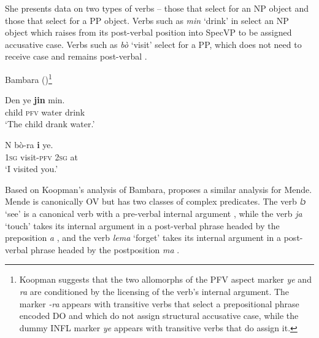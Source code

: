 \documentclass[output=paper,colorlinks,citecolor=brown,draftmode
]{langscibook}
\begin{document}
She presents data on two types of verbs – those that select for an NP object and those that select for a PP object. Verbs such as \textit{min} ‘drink’ in  select an NP object which raises from its post-verbal position into SpecVP to be assigned accusative case. Verbs such as \textit{bò} ‘visit’ select for a PP, which does not need to receive case and remains post-verbal . 


\ea \label{ex:Bambara}
Bambara (\citealt[6a and 7a]{koopman1992absence})\footnote{Koopman suggests that the two allomorphs of the PFV aspect marker \textit{ye} and \textit{ra} are conditioned by the licensing of the verb’s internal argument.  The marker \textit{-ra} appears with transitive verbs that select a prepositional phrase encoded DO and which do not assign structural accusative case, while the dummy INFL marker \textit{ye} appears with transitive verbs that do assign it.}
\begin{xlist}

\ex \label{ex:Bambara:Canonical}
\gll Den ye \textbf{jin} min. \\
child \textsc{pfv} water drink \\
\glt `The child drank water.'

\ex \label{ex:Bambara:PV}
\gll N bò-ra \textbf{i} ye. \\
\textsc{1sg} visit-\textsc{pfv} \textsc{2sg} at \\
\glt `I visited you.'

\end{xlist}
\z 

Based on Koopman’s analysis of Bambara, \citet{SmithCLS, SmithDiss} proposes a similar analysis for Mende. Mende is canonically OV but has two classes of complex predicates. The verb \textit{lɔ} ‘see’ is a canonical verb with a pre-verbal internal argument , while the verb \textit{ja} ‘touch’ takes its internal argument in a post-verbal phrase headed by the preposition \textit{a} , and the verb \textit{lema} ‘forget’ takes its internal argument in a post-verbal phrase headed by the postposition \textit{ma} . 
\end{document}
